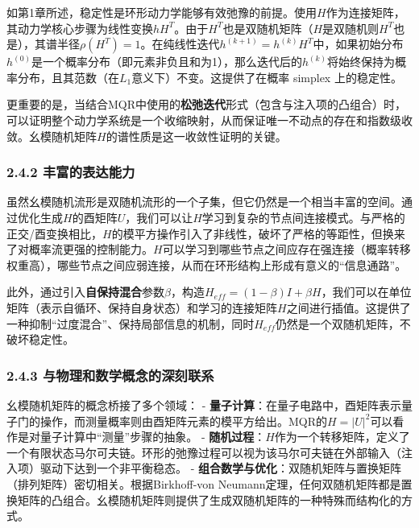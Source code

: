 \documentclass[
  12pt,
]{article}
\begin{document}
如第1章所述，稳定性是环形动力学能够有效弛豫的前提。使用\(H\)作为连接矩阵，其动力学核心步骤为线性变换\(h H^T\)。由于\(H^T\)也是双随机矩阵（\(H\)是双随机则\(H^T\)也是），其谱半径\(\rho(H^T)=1\)。在纯线性迭代\(h^{(k+1)} = h^{(k)} H^T\)中，如果初始分布\(h^{(0)}\)是一个概率分布（即元素非负且和为1），那么迭代后的\(h^{(k)}\)将始终保持为概率分布，且其范数（在\(L_1\)意义下）不变。这提供了在概率
simplex 上的稳定性。

更重要的是，当结合MQR中使用的\textbf{松弛迭代}形式（包含与注入项的凸组合）时，可以证明整个动力学系统是一个收缩映射，从而保证唯一不动点的存在和指数级收敛。幺模随机矩阵\(H\)的谱性质是这一收敛性证明的关键。

\hypertarget{ux4e30ux5bccux7684ux8868ux8fbeux80fdux529b}{%
\subsubsection{2.4.2
丰富的表达能力}\label{ux4e30ux5bccux7684ux8868ux8fbeux80fdux529b}}

虽然幺模随机流形是双随机流形的一个子集，但它仍然是一个相当丰富的空间。通过优化生成\(H\)的酉矩阵\(U\)，我们可以让\(H\)学习到复杂的节点间连接模式。与严格的正交/酉变换相比，\(H\)的模平方操作引入了非线性，破坏了严格的等距性，但换来了对概率流更强的控制能力。\(H\)可以学习到哪些节点之间应存在强连接（概率转移权重高），哪些节点之间应弱连接，从而在环形结构上形成有意义的``信息通路''。

此外，通过引入\textbf{自保持混合}参数\(\beta\)，构造\(H_{eff} = (1-\beta)I + \beta H\)，我们可以在单位矩阵（表示自循环、保持自身状态）和学习的连接矩阵\(H\)之间进行插值。这提供了一种抑制``过度混合''、保持局部信息的机制，同时\(H_{eff}\)仍然是一个双随机矩阵，不破坏稳定性。

\hypertarget{ux4e0eux7269ux7406ux548cux6570ux5b66ux6982ux5ff5ux7684ux6df1ux523bux8054ux7cfb}{%
\subsubsection{2.4.3
与物理和数学概念的深刻联系}\label{ux4e0eux7269ux7406ux548cux6570ux5b66ux6982ux5ff5ux7684ux6df1ux523bux8054ux7cfb}}

幺模随机矩阵的概念桥接了多个领域： -
\textbf{量子计算}：在量子电路中，酉矩阵表示量子门的操作，而测量概率则由酉矩阵元素的模平方给出。MQR的\(H=|U|^2\)可以看作是对量子计算中``测量''步骤的抽象。
-
\textbf{随机过程}：\(H\)作为一个转移矩阵，定义了一个有限状态马尔可夫链。环形的弛豫过程可以视为该马尔可夫链在外部输入（注入项）驱动下达到一个非平衡稳态。
-
\textbf{组合数学与优化}：双随机矩阵与置换矩阵（排列矩阵）密切相关。根据Birkhoff-von
Neumann定理，任何双随机矩阵都是置换矩阵的凸组合。幺模随机矩阵则提供了生成双随机矩阵的一种特殊而结构化的方式。
\end{document}
